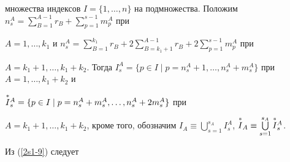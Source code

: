 множества индексов $I=\{1,\dotsc,n\}$ на подмножества. Положим $n^A_s=


\sum\limits_{B=1}^{A-1} r_B + \sum\limits_{p=1}^{s-1} m_p^A$ при


$A=1,\dotsc,k_1$ и $n_s^A = \sum\limits_{B=1}^{k_1} r_B +


2\sum\limits_{B=k_1+1}^{A-1} r_B + 2\sum\limits_{p=1}^{s-1} m_p^A$ при


$A=k_1 +1,\dotsc,k_1+k_2$. Тогда $I_s^A = \{ p\in I \mid


p=n^A_s+1,\dotsc,n^A_s+m^A_s\}$ при $A=1,\dotsc,k_1+k_2$ и


$\overset{*}{I}{}_s^A = \{ p\in I \mid p=n^A_s+m^A_s,\dotsc,n^A_s+2m^A_s\}$ при


$A=k_1+1,\dotsc,k_1+k_2$, кроме того, обозначим $I_A \equiv


\bigcup\limits^{s_A}_{s=1}I^A_s$, $\stup{I}_A \equiv


\bigcup\limits^{s_A}_{s=1}\stup{I}^A_s$.





Из (\ref{2s1-9}) следует





